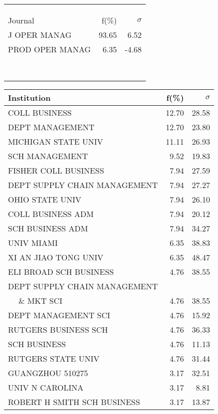 \documentclass[a4paper,11pt]{report}
\begin{document}
\begin{landscape}
\begin{table}[!ht]
{\begin{tabular}{|l r  r|}
 &  & \\
 &  & \\
 &  & \\
\hline
\hline
Journal & f(\%) & $\sigma$\\
\hline
J OPER MANAG & 93.65 & 6.52\\
PROD OPER MANAG & 6.35 & -4.68\\
 &  & \\
 &  & \\
 &  & \\
 &  & \\
 &  & \\
 &  & \\
 &  & \\
 &  & \\
\hline
\end{tabular}
}
{\scriptsize\begin{tabular}{|l r r|}
\hline
Institution & f(\%) & $\sigma$\\
\hline
COLL BUSINESS & 12.70 & 28.58\\
DEPT MANAGEMENT & 12.70 & 23.80\\
MICHIGAN STATE UNIV & 11.11 & 26.93\\
SCH MANAGEMENT & 9.52 & 19.83\\
FISHER COLL BUSINESS & 7.94 & 27.59\\
DEPT SUPPLY CHAIN MANAGEMENT & 7.94 & 27.27\\
OHIO STATE UNIV & 7.94 & 26.10\\
COLL BUSINESS ADM & 7.94 & 20.12\\
SCH BUSINESS ADM & 7.94 & 34.27\\
UNIV MIAMI & 6.35 & 38.83\\
XI AN JIAO TONG UNIV & 6.35 & 48.47\\
ELI BROAD SCH BUSINESS & 4.76 & 38.55\\
DEPT SUPPLY CHAIN MANAGEMENT &  & \\
$\quad$ \& MKT SCI & 4.76 & 38.55\\
DEPT MANAGEMENT SCI & 4.76 & 15.92\\
RUTGERS BUSINESS SCH & 4.76 & 36.33\\
SCH BUSINESS & 4.76 & 11.13\\
RUTGERS STATE UNIV & 4.76 & 31.44\\
GUANGZHOU 510275 & 3.17 & 32.51\\
UNIV N CAROLINA & 3.17 & 8.81\\
ROBERT H SMITH SCH BUSINESS & 3.17 & 13.87\\
\hline
\hline

\end{tabular}}
\end{table}
\end{landscape}
\end{document}
